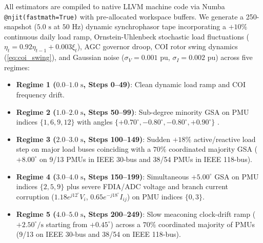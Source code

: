 \documentclass[journal,twoside]{IEEEtran}
\begin{document}
All estimators are compiled to native LLVM machine code via Numba \texttt{@njit(fastmath=True)} \cite{lam2015numba} with pre-allocated workspace buffers. We generate a 250-snapshot ($5.0\text{~s}$ at $50\text{~Hz}$) dynamic synchrophasor tape incorporating a $+10\%$ continuous daily load ramp, Ornstein-Uhlenbeck stochastic load fluctuations ($\eta_t = 0.92\eta_{t-1} + 0.003\xi_t$), AGC governor droop, COI rotor swing dynamics (\ref{eq:coi_swing}), and Gaussian noise ($\sigma_V = 0.001\text{~pu}$, $\sigma_I = 0.002\text{~pu}$) across five regimes:
\begin{itemize}
    \item \textbf{Regime 1 ($0.0\text{--}1.0\text{~s}$, Steps 0--49)}: Clean dynamic load ramp and COI frequency drift.
    \item \textbf{Regime 2 ($1.0\text{--}2.0\text{~s}$, Steps 50--99)}: Sub-degree minority GSA on PMU indices $\{1, 6, 9, 12\}$ with angles $\{+0.70^\circ, -0.80^\circ, -0.80^\circ, +0.90^\circ\}$ \cite{badugu2026synchrophasor}.
    \item \textbf{Regime 3 ($2.0\text{--}3.0\text{~s}$, Steps 100--149)}: Sudden $+18\%$ active/reactive load step on major load buses coinciding with a $70\%$ coordinated majority GSA ($+8.00^\circ$ on 9/13 PMUs in IEEE 30-bus and 38/54 PMUs in IEEE 118-bus).
    \item \textbf{Regime 4 ($3.0\text{--}4.0\text{~s}$, Steps 150--199)}: Simultaneous $+5.00^\circ$ GSA on PMU indices $\{2, 5, 9\}$ plus severe FDIA/ADC voltage and branch current corruption ($1.18 e^{j12^\circ}V_i$, $0.65 e^{-j18^\circ}I_{ij}$) on PMU indices $\{0, 3\}$.
    \item \textbf{Regime 5 ($4.0\text{--}5.0\text{~s}$, Steps 200--249)}: Slow meaconing clock-drift ramp ($+2.50^\circ/\text{s}$ starting from $+0.45^\circ$) across a $70\%$ coordinated majority of PMUs (9/13 on IEEE 30-bus and 38/54 on IEEE 118-bus).
\end{itemize}

\begin{table}[!t]
\centering
\footnotesize
\caption{Canonical MATPOWER Network Topology, Observability Verification, and Sparse Factor Characteristics}
\label{tab:topology}
\end{table}
\end{document}
